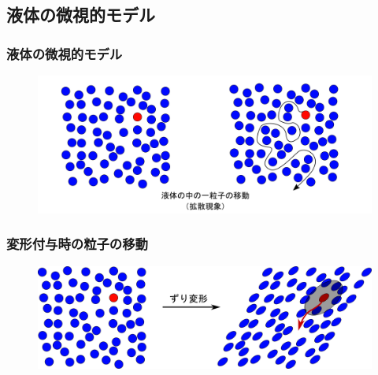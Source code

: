 \documentclass[10pt, dvipdfmx]{beamer}
\begin{document}
\subsection{液体の微視的モデル}
\begin{frame}
\frametitle{液体の微視的モデル}

\begin{figure}
 \centering
	\includegraphics[width=\textwidth]{liquid_1.png}
\end{figure}
\end{frame}

\begin{frame}
	\frametitle{変形付与時の粒子の移動}
	
	\begin{figure}
	 \centering
		\includegraphics[width=\textwidth]{liquid_flow.png}
	\end{figure}
	\end{frame}
\end{document}
